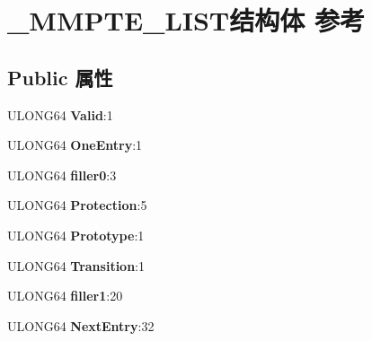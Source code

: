 \hypertarget{struct___m_m_p_t_e___l_i_s_t}{}\section{\+\_\+\+M\+M\+P\+T\+E\+\_\+\+L\+I\+S\+T结构体 参考}
\label{struct___m_m_p_t_e___l_i_s_t}
\subsection*{Public 属性}
\begin{DoxyCompactItemize}
\item 
\mbox{\label{struct___m_m_p_t_e___l_i_s_t_a722a9b980c44514711ad30a50ba45e0f}} 
U\+L\+O\+N\+G64 {\bfseries Valid}\+:1
\item 
\mbox{\label{struct___m_m_p_t_e___l_i_s_t_a47203ba88a5f54d28c7cbf015a929606}} 
U\+L\+O\+N\+G64 {\bfseries One\+Entry}\+:1
\item 
\mbox{\label{struct___m_m_p_t_e___l_i_s_t_a6b712ad39fee716c67febe983946dc91}} 
U\+L\+O\+N\+G64 {\bfseries filler0}\+:3
\item 
\mbox{\label{struct___m_m_p_t_e___l_i_s_t_aed79997ce993de15dca78ce9bbfc083f}} 
U\+L\+O\+N\+G64 {\bfseries Protection}\+:5
\item 
\mbox{\label{struct___m_m_p_t_e___l_i_s_t_a298e39fda0ee68c0544345355a5bf88b}} 
U\+L\+O\+N\+G64 {\bfseries Prototype}\+:1
\item 
\mbox{\label{struct___m_m_p_t_e___l_i_s_t_a2b533c743a1e8bfe0dc4fe7ecce8c7c9}} 
U\+L\+O\+N\+G64 {\bfseries Transition}\+:1
\item 
\mbox{\label{struct___m_m_p_t_e___l_i_s_t_a747e9b3253e5472e9fb50719d6e1a6c1}} 
U\+L\+O\+N\+G64 {\bfseries filler1}\+:20
\item 
\mbox{\label{struct___m_m_p_t_e___l_i_s_t_a9874bd31378e7eca1c4f8f26fb70902d}} 
U\+L\+O\+N\+G64 {\bfseries Next\+Entry}\+:32
\item 

\end{DoxyCompactItemize}
